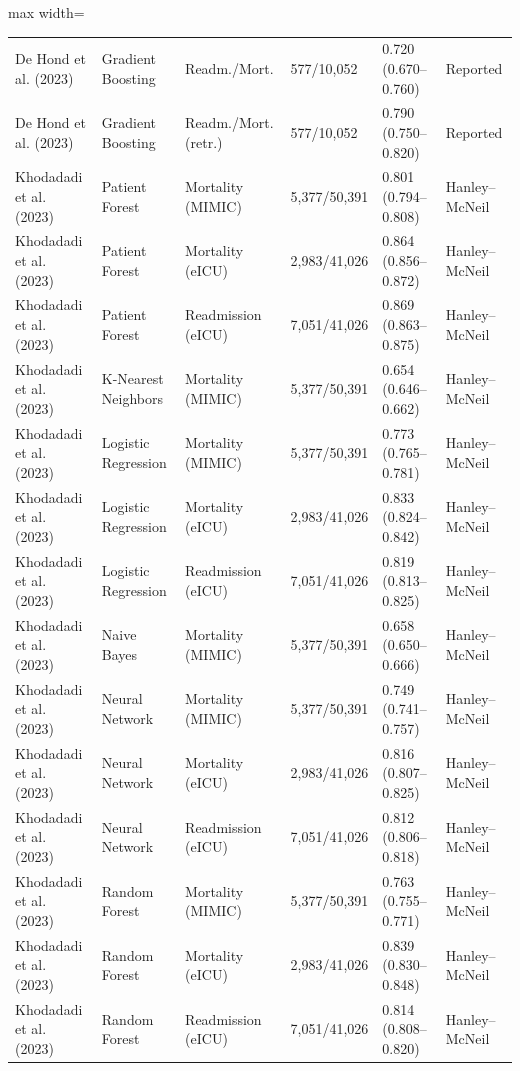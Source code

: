 \begin{table}[H]
\begin{adjustbox}{max width=\textwidth}
\begin{tabular}{llllll}
    De Hond et al. (2023) & Gradient Boosting & Readm./Mort. & 577/10,052 & 0.720 (0.670--0.760) & Reported \\
    De Hond et al. (2023) & Gradient Boosting & Readm./Mort. (retr.) & 577/10,052 & 0.790 (0.750--0.820) & Reported \\
    Khodadadi et al. (2023) & Patient Forest & Mortality (MIMIC) & 5,377/50,391 & 0.801 (0.794--0.808) & Hanley--McNeil \\
    Khodadadi et al. (2023) & Patient Forest & Mortality (eICU) & 2,983/41,026 & 0.864 (0.856--0.872) & Hanley--McNeil \\
    Khodadadi et al. (2023) & Patient Forest & Readmission (eICU) & 7,051/41,026 & 0.869 (0.863--0.875) & Hanley--McNeil \\
    Khodadadi et al. (2023) & K-Nearest Neighbors & Mortality (MIMIC) & 5,377/50,391 & 0.654 (0.646--0.662) & Hanley--McNeil \\
    Khodadadi et al. (2023) & Logistic Regression & Mortality (MIMIC) & 5,377/50,391 & 0.773 (0.765--0.781) & Hanley--McNeil \\
    Khodadadi et al. (2023) & Logistic Regression & Mortality (eICU) & 2,983/41,026 & 0.833 (0.824--0.842) & Hanley--McNeil \\
    Khodadadi et al. (2023) & Logistic Regression & Readmission (eICU) & 7,051/41,026 & 0.819 (0.813--0.825) & Hanley--McNeil \\
    Khodadadi et al. (2023) & Naive Bayes & Mortality (MIMIC) & 5,377/50,391 & 0.658 (0.650--0.666) & Hanley--McNeil \\
    Khodadadi et al. (2023) & Neural Network & Mortality (MIMIC) & 5,377/50,391 & 0.749 (0.741--0.757) & Hanley--McNeil \\
    Khodadadi et al. (2023) & Neural Network & Mortality (eICU) & 2,983/41,026 & 0.816 (0.807--0.825) & Hanley--McNeil \\
    Khodadadi et al. (2023) & Neural Network & Readmission (eICU) & 7,051/41,026 & 0.812 (0.806--0.818) & Hanley--McNeil \\
    Khodadadi et al. (2023) & Random Forest & Mortality (MIMIC) & 5,377/50,391 & 0.763 (0.755--0.771) & Hanley--McNeil \\
    Khodadadi et al. (2023) & Random Forest & Mortality (eICU) & 2,983/41,026 & 0.839 (0.830--0.848) & Hanley--McNeil \\
    Khodadadi et al. (2023) & Random Forest & Readmission (eICU) & 7,051/41,026 & 0.814 (0.808--0.820) & Hanley--McNeil \\

\end{tabular}
\end{adjustbox}
\end{table}
